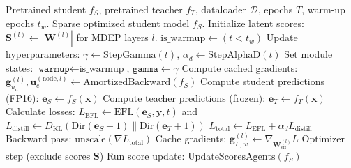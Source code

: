 \documentclass[11pt]{article}
\newcommand{\Dir}{\text{Dir}}
\newcommand{\KL}{D_{\text{KL}}}
\begin{document}
\begin{algorithm}[H]
\caption{Swin-MDEP Training and Optimization Loop}\label{alg:swin_mdep}
\begin{algorithmic}[1]
\Require Pretrained student $f_S$, pretrained teacher $f_T$, dataloader $\mathcal{D}$, epochs $T$, warm-up epochs $t_w$.
\Ensure Sparse optimized student model $f_S$.
\State Initialize latent scores: $\bm{S}^{(l)} \leftarrow |\bm{W}^{(l)}|$ for MDEP layers $l$.
    \State $\text{is\_warmup} \leftarrow (t < t_w)$
    \State Update hyperparameters: $\gamma \leftarrow \text{StepGamma}(t)$, $\alpha_d \leftarrow \text{StepAlphaD}(t)$
    \State Set module states: $\texttt{warmup} \leftarrow \text{is\_warmup}$, $\texttt{gamma} \leftarrow \gamma$
        \State Compute cached gradients: $\bm{g}_{u_a}^{(l)}, \bm{u}_e^{(\text{node}, l)} \leftarrow \text{AmortizedBackward}(f_S)$
    \EndIf
        \State Compute student predictions (FP16): $\bm{e}_S \leftarrow f_S(\bm{x})$
        \State Compute teacher predictions (frozen): $\bm{e}_T \leftarrow f_T(\bm{x})$
        \State Calculate losses: $L_{\text{EFL}} \leftarrow \text{EFL}(\bm{e}_S, \bm{y}, t)$ and $L_{\text{distill}} \leftarrow \KL(\Dir(\bm{e}_S+1) \| \Dir(\bm{e}_T+1))$
        \State $L_{\text{total}} \leftarrow L_{\text{EFL}} + \alpha_d L_{\text{distill}}$
        \State Backward pass: $\text{unscale}(\nabla L_{\text{total}})$
        \State Cache gradients: $\bm{g}_{L,w}^{(l)} \leftarrow \nabla_{\bm{W}_{\text{eff}}^{(l)}} L$
        \State Optimizer step (exclude scores $\bm{S}$)
            \State Run score update: $\text{UpdateScoresAgents}(f_S)$ 
        \EndIf
    \EndFor
\EndFor
\end{algorithmic}
\end{algorithm}
\end{document}
